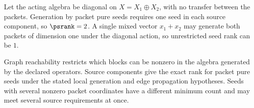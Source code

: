 \begin{microexample}[title={Why mixed seeds change the answer}]
Let the acting algebra be diagonal on \(X=X_1\oplus X_2\), with no transfer between the packets.  Generation by packet pure seeds requires one seed in each source component, so \(\psrank=2\).  A single mixed vector \(x_1+x_2\) may generate both packets of dimension one under the diagonal action, so unrestricted seed rank can be \(1\).
\end{microexample}

\begin{sectionrecap}
Graph reachability restricts which blocks can be nonzero in the algebra generated by the declared operators.  Source components give the exact rank for packet pure seeds under the stated local generation and edge propagation hypotheses.  Seeds with several nonzero packet coordinates have a different minimum count and may meet several source requirements at once.
\end{sectionrecap}


